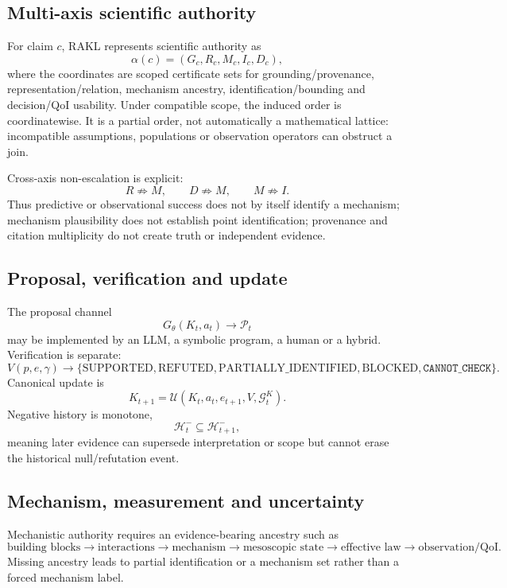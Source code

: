 \documentclass[11pt]{article}
\newcommand{\RAKL}{\textsc{RAKL}}
\newcommand{\CannotCheck}{\texttt{CANNOT\_CHECK}}
\begin{document}
\subsection{Multi-axis scientific authority}
For claim $c$, \RAKL{} represents scientific authority as
\begin{equation}
\alpha(c)=(G_c,R_c,M_c,I_c,D_c),
\end{equation}
where the coordinates are scoped certificate sets for grounding/provenance, representation/relation, mechanism ancestry, identification/bounding and decision/QoI usability. Under compatible scope, the induced order is coordinatewise. It is a partial order, not automatically a mathematical lattice: incompatible assumptions, populations or observation operators can obstruct a join.

Cross-axis non-escalation is explicit:
\begin{equation}
R\not\Rightarrow M,\qquad D\not\Rightarrow M,\qquad M\not\Rightarrow I.
\end{equation}
Thus predictive or observational success does not by itself identify a mechanism; mechanism plausibility does not establish point identification; provenance and citation multiplicity do not create truth or independent evidence.

\subsection{Proposal, verification and update}
The proposal channel
\begin{equation}
G_\theta(K_t,a_t)\rightarrow\mathcal P_t
\end{equation}
may be implemented by an LLM, a symbolic program, a human or a hybrid. Verification is separate:
\begin{equation}
V(p,e,\gamma)\rightarrow\{\mathrm{SUPPORTED},\mathrm{REFUTED},\mathrm{PARTIALLY\_IDENTIFIED},\mathrm{BLOCKED},\CannotCheck\}.
\end{equation}
Canonical update is
\begin{equation}
K_{t+1}=\mathcal U(K_t,a_t,e_{t+1},V,\mathcal G_t^K).
\end{equation}
Negative history is monotone,
\begin{equation}
\mathcal H_t^{-}\subseteq\mathcal H_{t+1}^{-},
\end{equation}
meaning later evidence can supersede interpretation or scope but cannot erase the historical null/refutation event.

\subsection{Mechanism, measurement and uncertainty}
Mechanistic authority requires an evidence-bearing ancestry such as
\begin{equation}
\text{building blocks}\to\text{interactions}\to\text{mechanism}\to\text{mesoscopic state}\to\text{effective law}\to\text{observation/QoI}.
\end{equation}
Missing ancestry leads to partial identification or a mechanism set rather than a forced mechanism label.
\end{document}

